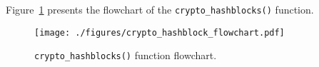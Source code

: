 Figure~\ref{fig:hash-flowchart} presents the flowchart of the \texttt{crypto\_hashblocks()} function.

\begin{figure}[!htbp]
    \centerline{\texttt{[image: ./figures/crypto\_hashblock\_flowchart.pdf]}}
    \vspace{0cm}\caption{\texttt{crypto\_hashblocks()} function flowchart.}
    \label{fig:hash-flowchart}
\end{figure}

